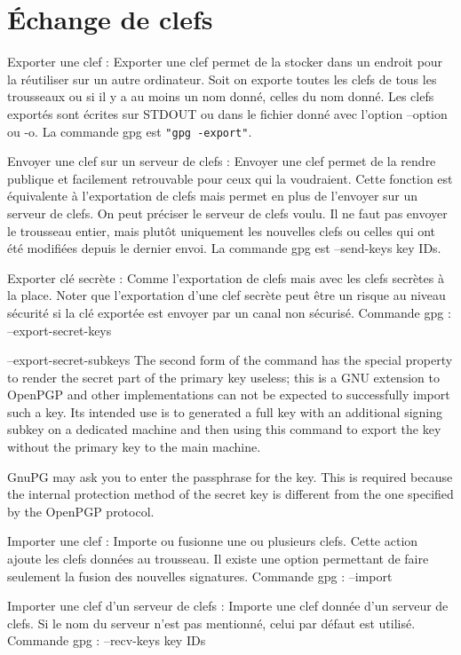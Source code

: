 \section{Échange de clefs}

Exporter une clef :
    Exporter une clef permet de la stocker dans un endroit pour la réutiliser sur un autre ordinateur.
    Soit on exporte toutes les clefs de tous les trousseaux ou si il y a au moins un nom donné, celles du nom donné. Les clefs exportés sont écrites
    sur STDOUT ou dans le fichier donné avec l'option --option ou -o.
    La commande gpg est \texttt{"gpg -\-export"}.

Envoyer une clef sur un serveur de clefs :
    Envoyer une clef permet de la rendre publique et facilement retrouvable pour ceux qui la voudraient.
    Cette fonction est équivalente à l'exportation de clefs mais permet en plus de l'envoyer sur un serveur de clefs. On peut préciser le
    serveur de clefs voulu. Il ne faut pas envoyer le trousseau entier, mais plutôt uniquement les nouvelles clefs ou celles qui ont été modifiées
    depuis le dernier envoi.
    La commande gpg est --send-keys key IDs.

Exporter clé secrète :
    Comme l'exportation de clefs mais avec les clefs secrètes à la place. Noter que l'exportation d'une clef secrète peut être un risque au niveau
    sécurité si la clé exportée est envoyer par un canal non sécurisé.
    Commande gpg : --export-secret-keys


--export-secret-subkeys
    The second form of the command has the special property to render the secret part of the primary key useless; this is a GNU extension to OpenPGP and other implementations can not be expected to successfully import such a key. Its intended use is to generated a full key with an additional signing subkey on a dedicated machine and then using this command to export the key without the primary key to the main machine.

    GnuPG may ask you to enter the passphrase for the key. This is required because the internal protection method of the secret key is different from the one specified by the OpenPGP protocol.

Importer une clef :
    Importe ou fusionne une ou plusieurs clefs. Cette action ajoute les clefs données au trousseau.
    Il existe une option permettant de faire seulement la fusion des nouvelles signatures.
    Commande gpg : --import

Importer une clef d'un serveur de clefs : 
    Importe une clef donnée d'un serveur de clefs. Si le nom du serveur n'est pas mentionné, celui par défaut est utilisé.
    Commande gpg : --recv-keys key IDs


